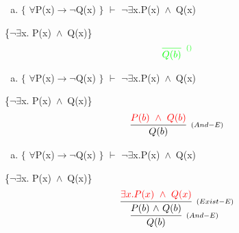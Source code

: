 \documentclass[aspectratio=43]{beamer}
\newcommand{\ria}{$\rightarrow$}
\newcommand{\fall}{$\forall$}
\newcommand{\ex}{$\exists$}
\newcommand{\nao}{$\neg$}
\newcommand{\nex}{\nao\ex}
\newcommand{\andd}{$\wedge$}
\begin{document}
    \begin{frame}[fragile]
    	
    	\begin{enumerate}[b)]
			
			\item $\{$ \fall P(x)\ria \nao Q(x) $\}$ $\vdash$ \nex  x.P(x)\ \andd\ Q(x) \\ 
			
		\end{enumerate}
        \{\nex  x. P(x)\ \andd\ Q(x)\}
        \vspace{100pt}
        \[
        \begin{array}{c}
		
        	\textcolor{green}{
            \infer[_{()}]
            {Q(b)}
            {}
            }
		\end{array}
        \]
        
	\end{frame}
    
    \begin{frame}[fragile]
    	
    	\begin{enumerate}[b)]
			
			\item $\{$ \fall P(x)\ria \nao Q(x) $\}$ $\vdash$ \nex  x.P(x)\ \andd\ Q(x) \\ 
			
		\end{enumerate}
        \{\nex  x. P(x)\ \andd\ Q(x)\}
        \vspace{95pt}
        \[
        \begin{array}{c}
		
        	\infer[_{(And-E)}]
            {Q(b)}
            {\textcolor{red}{P(b)\ \wedge \ Q(b)}}
		\end{array}
        \]
        
	\end{frame}
    
    \begin{frame}[fragile]
    	
    	\begin{enumerate}[b)]
			
			\item $\{$ \fall P(x)\ria \nao Q(x) $\}$ $\vdash$ \nex  x.P(x)\ \andd\ Q(x) \\ 
			
		\end{enumerate}
        \{\nex  x. P(x)\ \andd\ Q(x)\}
        \vspace{90pt}
        \[
        \begin{array}{c}
		
        	\infer[_{(And-E)}]
            {Q(b)}
            {\infer[_{(Exist-E)}]
                {P(b)\ $\andd$\ Q(b)}
            	{\textcolor{red}{\exists x.P(x)\ \wedge\ Q(x)}}
            }
		\end{array}
        \]
        
	\end{frame}
    
\end{document}
